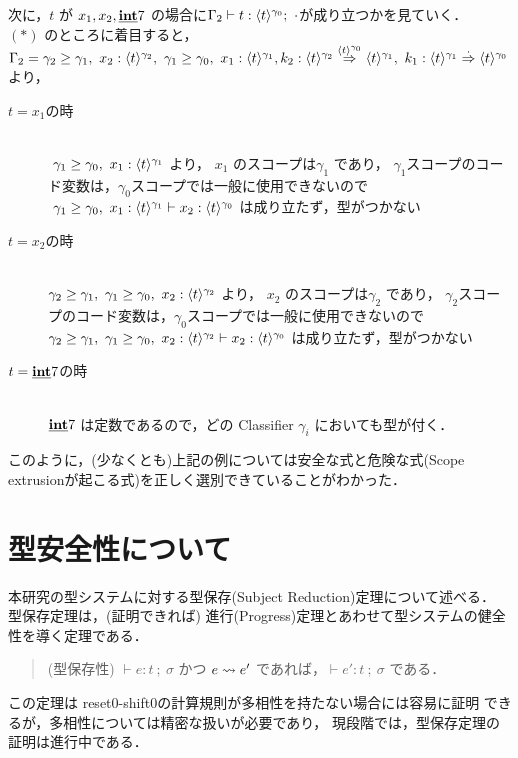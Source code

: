 次に，$t$ が $x_1, x_2, \underline{\textbf{int}} 7$ の場合に$\Gamma_2 \vdash t : \langle{t}\rangle^{\gamma_0};~ \cdot$が成り立つかを見ていく．\\
$(*)$ のところに着目すると，
$\Gamma_2 = {\gamma_2} \ge {\gamma_1},~x_2:\langle{t}\rangle^{\gamma_2},~{\gamma_1} \ge {\gamma_0},~x_1:\langle{t}\rangle^{\gamma_1},k_2:{\langle{t}\rangle^{\gamma_2}} \stackrel{\langle{t}\rangle^{\gamma_0}}{\Rightarrow} {\langle{t}\rangle^{\gamma_1}},~k_1:{\langle{t}\rangle^{\gamma_1}} \stackrel{\cdot{}}{\Rightarrow} {\langle{t}\rangle^{\gamma_0}}$
より，
\begin{description}
\item[$t=x_1$の時]\mbox{}\\
  $~{\gamma_1} \ge {\gamma_0},~x_1:\langle{t}\rangle^{\gamma_1}$ より，
  $x_1$ のスコープは$\gamma_1$ であり，
  $\gamma_1$スコープのコード変数は，$\gamma_0$スコープでは一般に使用できないので
  $~{\gamma_1} \ge {\gamma_0},~x_1:\langle{t}\rangle^{\gamma_1} \vdash x_2:\langle{t}\rangle^{\gamma_0}$ は成り立たず，型がつかない
\item[$t=x_2$の時]\mbox{}\\
  ${\gamma_2} \ge {\gamma_1},~{\gamma_1} \ge {\gamma_0},~x_2:\langle{t}\rangle^{\gamma_2}$ より，
  $x_2$ のスコープは$\gamma_2$ であり，
  $\gamma_2$スコープのコード変数は，$\gamma_0$スコープでは一般に使用できないので
  ${\gamma_2} \ge {\gamma_1},~{\gamma_1} \ge {\gamma_0},~x_2:\langle{t}\rangle^{\gamma_2} \vdash x_2:\langle{t}\rangle^{\gamma_0}$ は成り立たず，型がつかない
\item[$t= \underline{\textbf{int}} 7$の時]\mbox{}\\
  $\underline{\textbf{int}} 7$ は定数であるので，どの Classifier $\gamma_i$ においても型が付く．
\end{description}

このように，(少なくとも)上記の例については安全な式と危険な式(Scope extrusionが起こる式)を正しく選別できていることがわかった．

\section{型安全性について}

本研究の型システムに対する型保存(Subject Reduction)定理について述べる．
型保存定理は，(証明できれば)
進行(Progress)定理とあわせて型システムの健全性を導く定理である．

\begin{quote}
  (型保存性)
  $\vdash e:t~;~\sigma$ かつ $e \leadsto e'$ であれば，$\vdash e':t~;~\sigma$
  である．
\end{quote}

この定理は reset0-shift0の計算規則が多相性を持たない場合には容易に証明
できるが，多相性については精密な扱いが必要であり，
現段階では，型保存定理の証明は進行中である．


